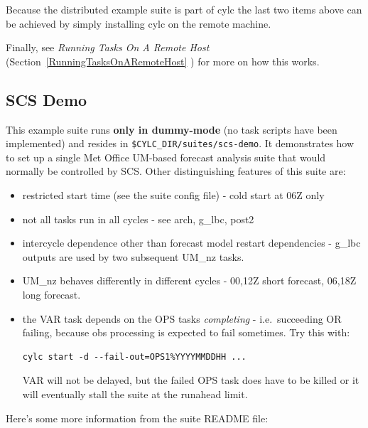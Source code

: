\documentclass[11pt,a4paper]{article}
\begin{document}
Because the distributed example suite is part of cylc the last two
items above can be achieved by simply installing cylc on the remote
machine. 

Finally, see {\em Running Tasks On A Remote Host}
(Section~\ref{RunningTasksOnARemoteHost} ) for more on how this works.

\subsection{SCS Demo}

This example suite runs {\bf only in dummy-mode} (no task scripts
have been implemented) and resides in
\lstinline=$CYLC_DIR/suites/scs-demo=.
It demonstrates how to set up a single Met Office
UM-based forecast analysis suite that would normally be controlled by
SCS.  Other distinguishing features of this suite are:

\begin{itemize}

    \item restricted start time (see the suite config file) - cold start at 06Z only

    \item not all tasks run in all cycles - see arch, g\_lbc, post2

    \item intercycle dependence other than forecast model restart 
        dependencies - g\_lbc outputs are used by two subsequent UM\_nz
        tasks.

    \item UM\_nz behaves differently in different cycles - 00,12Z short
        forecast, 06,18Z long forecast.

    \item the VAR task depends on the OPS tasks {\em completing} - i.e.\
        succeeding OR failing, because obs processing is expected to
        fail sometimes.  Try this with:

        \begin{lstlisting}
cylc start -d --fail-out=OPS1%YYYYMMDDHH ...
        \end{lstlisting}

        VAR will not be delayed, but the failed OPS task does have to be
        killed or it will eventually stall the suite at the runahead
        limit.
        
\end{itemize}

Here's some more information from the suite README file:
\end{document}
